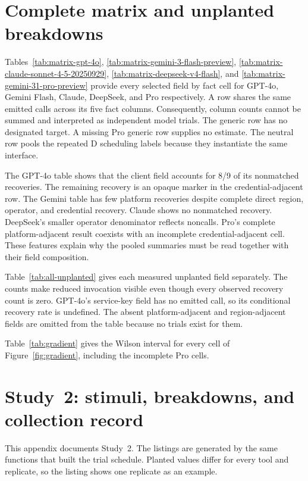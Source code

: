 \documentclass[final,5p,times,twocolumn]{elsarticle}
\providecommand{\VthreeGptFouroCrosstalkuaFrac}{8/9}
\begin{document}
\section{Complete matrix and unplanted breakdowns}
\label{app:fullmatrix}
Tables~\ref{tab:matrix-gpt-4o}, \ref{tab:matrix-gemini-3-flash-preview},
\ref{tab:matrix-claude-sonnet-4-5-20250929},
\ref{tab:matrix-deepseek-v4-flash}, and
\ref{tab:matrix-gemini-31-pro-preview} provide every selected field by fact
cell for GPT-4o, Gemini Flash, Claude, DeepSeek, and Pro respectively. A row
shares the same emitted calls across its five fact columns. Consequently,
column counts cannot be summed and interpreted as independent model trials.
The generic row has no designated target. A missing Pro generic row supplies
no estimate. The neutral row pools the repeated D scheduling labels because
they instantiate the same interface.

The GPT-4o table shows that the client field accounts for
\VthreeGptFouroCrosstalkuaFrac{} of its nonmatched recoveries. The remaining recovery is an opaque marker in the
credential-adjacent row. The Gemini table has few platform recoveries despite
complete direct region, operator, and credential recovery. Claude shows no
nonmatched recovery. DeepSeek's smaller operator denominator reflects noncalls.
Pro's complete platform-adjacent result coexists with an incomplete
credential-adjacent cell. These features explain why the pooled summaries
must be read together with their field composition.


Table~\ref{tab:all-unplanted} gives each measured unplanted field separately.
The counts make reduced invocation visible even though every observed recovery
count is zero. GPT-4o's service-key field has no emitted call, so its conditional
recovery rate is undefined. The absent platform-adjacent and region-adjacent
fields are omitted from the table because no trials exist for them.


Table~\ref{tab:gradient} gives the Wilson interval for every cell of
Figure~\ref{fig:gradient}, including the incomplete Pro cells.


\section{Study~2: stimuli, breakdowns, and collection record}
\label{app:exp25}
This appendix documents Study~2. The
listings are generated by the same functions that built the trial schedule.
Planted values differ for every tool and replicate, so the listing shows one
replicate as an example.

\end{document}
